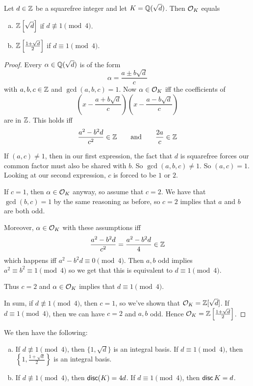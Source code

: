 \begin{theorem*}
    Let $d\in\mathbb Z$ be a squarefree integer and let $K = \mathbb Q(\sqrt{d})$. Then $\mathcal{O}_K$ equals
    \begin{enumerate}[a)]
        \item $\mathbb Z\left[\sqrt{d}\right]$ if $d\not\equiv 1\pmod{4}$.
        \item $\mathbb Z\left[\frac{1+\sqrt{d}}{2}\right]$ if $d\equiv 1\pmod{4}$.
    \end{enumerate}
\end{theorem*}
\begin{proof}
    Every $\alpha\in\mathbb Q(\sqrt{d})$ is of the form
    \[\alpha = \frac{a\pm b\sqrt{d}}{c}\]
    with $a, b, c\in\mathbb Z$ and $\gcd(a, b, c) = 1$. Now $\alpha\in\mathcal{O}_K$ iff the coefficients of
    \[\left( x - \frac{a + b\sqrt{d}}{c} \right)\left( x - \frac{a - b\sqrt{d}}{c} \right)\]
    are in $\mathbb Z$. This holds iff
    \[\frac{a^2 - b^2d}{c^2}\in\mathbb Z\qquad\text{and}\qquad \frac{2a}{c}\in\mathbb Z\]

    If $(a, c)\neq 1$, then in our first expression, the fact that $d$ is squarefree forces our common factor must also be shared with $b$. So $\gcd(a, b, c)\neq 1$. So $(a, c) = 1$. Looking at our second expression, $c$ is forced to be $1$ or $2$.

    If $c = 1$, then $\alpha\in\mathcal{O}_K$ anyway, so assume that $c = 2$. We have that $\gcd(b, c) = 1$ by the same reasoning as before, so $c=2$ implies that $a$ and $b$ are both odd.

    Moreover, $\alpha\in\mathcal{O}_K$ with these assumptions iff
    \[\frac{a^2 - b^2d}{c^2} = \frac{a^2 - b^2d}{4}\in\mathbb Z\]
    which happens iff $a^2 - b^2d\equiv 0\pmod{4}$. Then $a, b$ odd implies $a^2 \equiv b^2\equiv 1\pmod{4}$ so we get that this is equivalent to $d\equiv 1\pmod{4}$.

    Thus $c = 2$ and $\alpha\in\mathcal{O}_K$ implies that $d\equiv 1\pmod{4}$.

    In sum, if $d\not\equiv 1\pmod{4}$, then $c = 1$, so we've shown that $\mathcal{O}_K = \mathbb Z[\sqrt{d}]$. If $d\equiv 1\pmod{4}$, then we can have $c = 2$ and $a, b$ odd. Hence $\mathcal{O}_K = \mathbb Z\left[ \frac{1+\sqrt{d}}{2} \right]$.
\end{proof}

\begin{theorem}
    We then have the following:
    \begin{enumerate}[a)]
        \item If $d\not\equiv 1\pmod{4}$, then $\{1, \sqrt{d}\}$ is an integral basis. If $d\equiv 1\pmod{4}$, then $\left\{1, \frac{1+\sqrt{d}}{2}\right\}$ is an integral basis.
        \item If $d\not\equiv 1\pmod{4}$, then $\operatorname{\mathsf{disc}}(K) = 4d$. If $d\equiv 1\pmod{4}$, then $\operatorname{\mathsf{disc}}{K} = d$.
    \end{enumerate}
\end{theorem}

